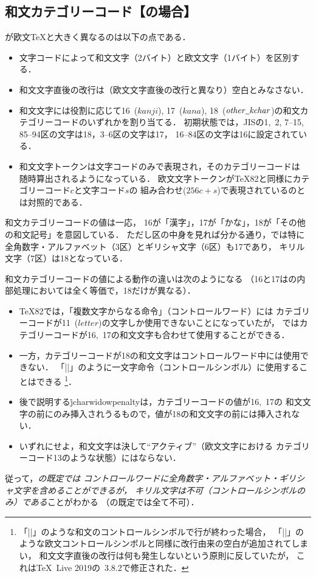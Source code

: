 \documentclass[a4paper,11pt,nomag,dvipdfmx]{jsarticle}
\def\_{\leavevmode\vrule width .45em height -.2ex depth .3ex\relax}
\begin{document}
\subsection{和文カテゴリーコード【\pTeX の場合】}
\label{sec:ptex_kcat}
\pTeX が欧文\TeX と大きく異なるのは以下の点である．
\begin{itemize}
  \item 文字コードによって和文文字（2バイト）と欧文文字（1バイト）を区別する．
  \item 和文文字直後の改行は（欧文文字直後の改行と異なり）空白とみなさない．
  \item 和文文字には役割に応じて16~($\mathit{kanji}$), 17~($\mathit{kana}$),
    18~($\mathit{other\_kchar}$)の和文カテゴリーコードのいずれかを割り当てる．
    初期状態では，JISの1,~2, 7--15, 85--94区の文字は18，3--6区の文字は17，
    16--84区の文字は16に設定されている．
  \item 和文文字トークンは文字コードのみで表現され，そのカテゴリーコードは
    随時算出されるようになっている．
    欧文文字トークンが\TeX82と同様にカテゴリーコード$c$と文字コード$s$の
    組み合わせ($256c+s$)で表現されているのとは対照的である．
\end{itemize}
和文カテゴリーコードの値は一応，
16が「漢字」，17が「かな」，18が「その他の和文記号」を意図している．
ただし区の中身を見れば分かる通り，\pTeX では特に
全角数字・アルファベット（3区）とギリシャ文字（6区）も17であり，
キリル文字（7区）は18となっている．

和文カテゴリーコードの値による動作の違いは次のようになる
（16と17は\pTeX の内部処理においては全く等価で，18だけが異なる）．
\begin{itemize}
  \item \TeX82では，「複数文字からなる命令」（コントロールワード）には
    カテゴリーコードが11~($\mathit{letter}$)の文字しか使用できないことになっていたが，
    \pTeX ではカテゴリーコードが16,~17の和文文字も合わせて使用することができる．
  \item 一方，カテゴリーコードが18の和文文字はコントロールワード中には使用できない．
    「|\】|」のように一文字命令（コントロールシンボル）に使用することはできる
    \footnote{「|\】|」のような和文のコントロールシンボルで行が終わった場合，
    「|\!|」のような欧文コントロールシンボルと同様に改行由来の空白が追加されてしまい，
    和文文字直後の改行は何も発生しないという原則に反していたが，
    これは\TeX~Live 2019の\pTeX~3.8.2で修正された\cite{tjb37}．}．
  \item 後で説明する\.{jcharwidowpenalty}は，カテゴリーコードの値が16,~17の
    和文文字の前にのみ挿入されうるもので，値が18の和文文字の前には挿入されない．
  \item いずれにせよ，和文文字は決して“アクティブ”（欧文文字における
    カテゴリーコード13のような状態）にはならない．
\end{itemize}
従って，\emph{\pTeX の既定では
コントロールワードに全角数字・アルファベット・ギリシャ文字を含めることができるが，
キリル文字は不可（コントロールシンボルのみ）である}ことがわかる
（\upTeX の既定では全て不可）．
\end{document}
